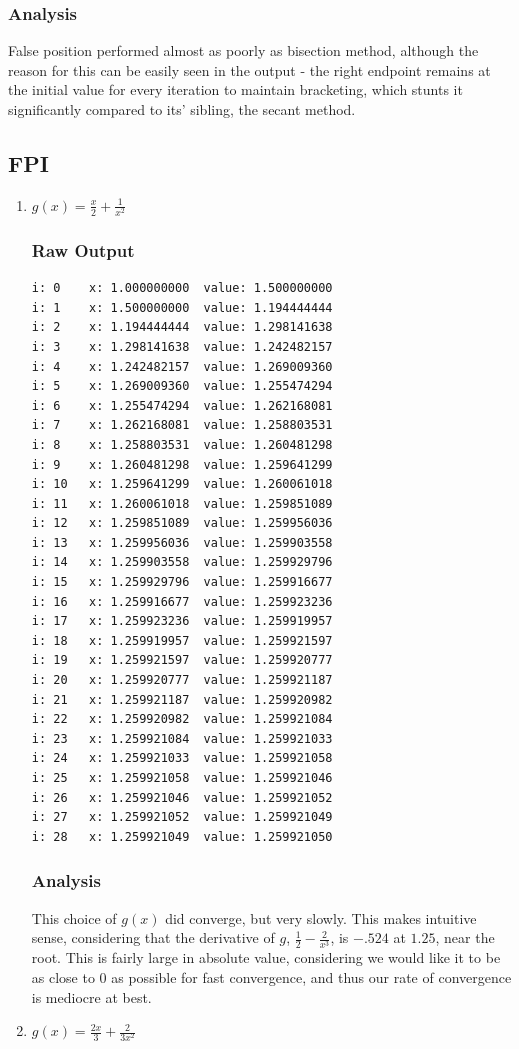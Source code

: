 \documentclass[11pt]{article} %
\begin{document}
\subsubsection*{Analysis}
False position performed almost as poorly as bisection method, although the reason for this can be easily seen in the output - the right endpoint remains at the initial value for every iteration to maintain bracketing, which stunts it significantly compared to its' sibling, the secant method. 
\subsection*{FPI}
\begin{enumerate}
\item $g(x) = \frac{x}{2}+ \frac{1}{x^2}$
\subsubsection*{Raw Output}
\begin{verbatim}
i: 0	x: 1.000000000	value: 1.500000000
i: 1	x: 1.500000000	value: 1.194444444
i: 2	x: 1.194444444	value: 1.298141638
i: 3	x: 1.298141638	value: 1.242482157
i: 4	x: 1.242482157	value: 1.269009360
i: 5	x: 1.269009360	value: 1.255474294
i: 6	x: 1.255474294	value: 1.262168081
i: 7	x: 1.262168081	value: 1.258803531
i: 8	x: 1.258803531	value: 1.260481298
i: 9	x: 1.260481298	value: 1.259641299
i: 10	x: 1.259641299	value: 1.260061018
i: 11	x: 1.260061018	value: 1.259851089
i: 12	x: 1.259851089	value: 1.259956036
i: 13	x: 1.259956036	value: 1.259903558
i: 14	x: 1.259903558	value: 1.259929796
i: 15	x: 1.259929796	value: 1.259916677
i: 16	x: 1.259916677	value: 1.259923236
i: 17	x: 1.259923236	value: 1.259919957
i: 18	x: 1.259919957	value: 1.259921597
i: 19	x: 1.259921597	value: 1.259920777
i: 20	x: 1.259920777	value: 1.259921187
i: 21	x: 1.259921187	value: 1.259920982
i: 22	x: 1.259920982	value: 1.259921084
i: 23	x: 1.259921084	value: 1.259921033
i: 24	x: 1.259921033	value: 1.259921058
i: 25	x: 1.259921058	value: 1.259921046
i: 26	x: 1.259921046	value: 1.259921052
i: 27	x: 1.259921052	value: 1.259921049
i: 28	x: 1.259921049	value: 1.259921050
\end{verbatim}
\subsubsection*{Analysis}
This choice of $g(x)$ did converge, but very slowly. This makes intuitive sense, considering that the derivative of $g$, $\frac{1}{2} - \frac{2}{x^3}$, is $-.524$ at $1.25$, near the root.  This is fairly large in absolute value, considering we would like it to be as close to $0$ as possible for fast convergence, and thus our rate of convergence is mediocre at best.
\item $g(x) = \frac{2x}{3}+ \frac{2}{3x^2}$

\end{enumerate}
\end{document}
